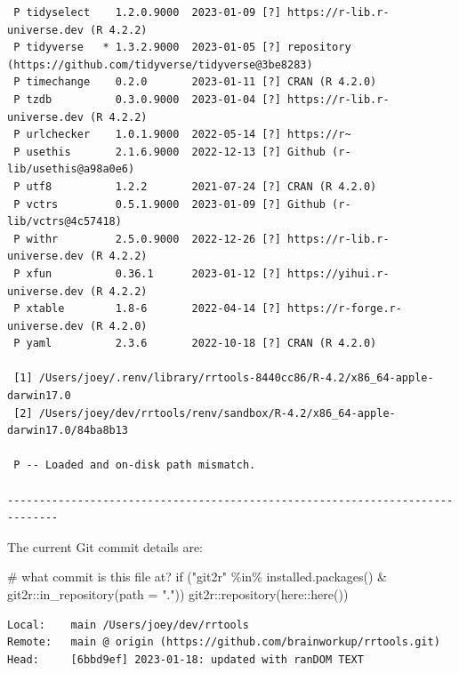 \documentclass[
  super,
  preprint,
  3p]{elsarticle}
\newenvironment{Shaded}{\begin{snugshade}}{\end{snugshade}}
\newcommand{\AttributeTok}[1]{\textcolor[rgb]{0.40,0.45,0.13}{#1}}
\newcommand{\CommentTok}[1]{\textcolor[rgb]{0.37,0.37,0.37}{#1}}
\newcommand{\ControlFlowTok}[1]{\textcolor[rgb]{0.00,0.23,0.31}{#1}}
\newcommand{\FunctionTok}[1]{\textcolor[rgb]{0.28,0.35,0.67}{#1}}
\newcommand{\NormalTok}[1]{\textcolor[rgb]{0.00,0.23,0.31}{#1}}
\newcommand{\SpecialCharTok}[1]{\textcolor[rgb]{0.37,0.37,0.37}{#1}}
\newcommand{\StringTok}[1]{\textcolor[rgb]{0.13,0.47,0.30}{#1}}
\begin{document}
\begin{verbatim}
 P tidyselect    1.2.0.9000  2023-01-09 [?] https://r-lib.r-universe.dev (R 4.2.2)
 P tidyverse   * 1.3.2.9000  2023-01-05 [?] repository (https://github.com/tidyverse/tidyverse@3be8283)
 P timechange    0.2.0       2023-01-11 [?] CRAN (R 4.2.0)
 P tzdb          0.3.0.9000  2023-01-04 [?] https://r-lib.r-universe.dev (R 4.2.2)
 P urlchecker    1.0.1.9000  2022-05-14 [?] https://r~
 P usethis       2.1.6.9000  2022-12-13 [?] Github (r-lib/usethis@a98a0e6)
 P utf8          1.2.2       2021-07-24 [?] CRAN (R 4.2.0)
 P vctrs         0.5.1.9000  2023-01-09 [?] Github (r-lib/vctrs@4c57418)
 P withr         2.5.0.9000  2022-12-26 [?] https://r-lib.r-universe.dev (R 4.2.2)
 P xfun          0.36.1      2023-01-12 [?] https://yihui.r-universe.dev (R 4.2.2)
 P xtable        1.8-6       2022-04-14 [?] https://r-forge.r-universe.dev (R 4.2.0)
 P yaml          2.3.6       2022-10-18 [?] CRAN (R 4.2.0)

 [1] /Users/joey/.renv/library/rrtools-8440cc86/R-4.2/x86_64-apple-darwin17.0
 [2] /Users/joey/dev/rrtools/renv/sandbox/R-4.2/x86_64-apple-darwin17.0/84ba8b13

 P -- Loaded and on-disk path mismatch.

------------------------------------------------------------------------------
\end{verbatim}

The current Git commit details are:

\begin{Shaded}
\begin{Highlighting}[]
\CommentTok{\# what commit is this file at? }
\ControlFlowTok{if}\NormalTok{ (}\StringTok{"git2r"} \SpecialCharTok{\%in\%} \FunctionTok{installed.packages}\NormalTok{() }\SpecialCharTok{\&}\NormalTok{ git2r}\SpecialCharTok{::}\FunctionTok{in\_repository}\NormalTok{(}\AttributeTok{path =} \StringTok{"."}\NormalTok{)) git2r}\SpecialCharTok{::}\FunctionTok{repository}\NormalTok{(here}\SpecialCharTok{::}\FunctionTok{here}\NormalTok{())  }
\end{Highlighting}
\end{Shaded}

\begin{verbatim}
Local:    main /Users/joey/dev/rrtools
Remote:   main @ origin (https://github.com/brainworkup/rrtools.git)
Head:     [6bbd9ef] 2023-01-18: updated with ranDOM TEXT
\end{verbatim}


  
\end{document}
